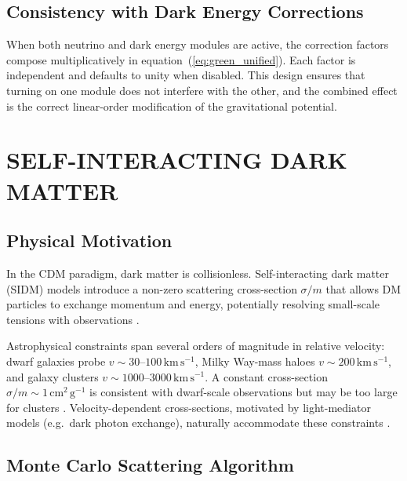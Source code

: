 \documentclass[fleqn,usenatbib]{mnras}
\newcommand{\sigmam}{\sigma/m}
\newcommand{\kms}{\,\mathrm{km\,s^{-1}}}
\begin{document}
\subsection{Consistency with Dark Energy Corrections}
\label{sec:nu_de_compose}

When both neutrino and dark energy modules are active, the correction
factors compose multiplicatively in equation~(\ref{eq:green_unified}).
Each factor is independent and defaults to unity when disabled.  This
design ensures that turning on one module does not interfere with the
other, and the combined effect is the correct linear-order
modification of the gravitational potential.


\section{SELF-INTERACTING DARK MATTER}
\label{sec:sidm}

\subsection{Physical Motivation}
\label{sec:sidm_motivation}

In the CDM paradigm, dark matter is collisionless.
Self-interacting dark matter (SIDM) models introduce a non-zero
scattering cross-section $\sigmam$ that allows DM particles to
exchange momentum and energy, potentially resolving small-scale
tensions with observations \citep{Spergel2000,Tulin2018}.

Astrophysical constraints span several orders of magnitude in
relative velocity: dwarf galaxies probe $v \sim 30$--$100\kms$,
Milky Way-mass haloes $v \sim 200\kms$, and galaxy clusters
$v \sim 1000$--$3000\kms$.  A constant cross-section
$\sigmam \sim 1\,\mathrm{cm^2\,g^{-1}}$ is consistent with
dwarf-scale observations but may be too large for clusters
\citep{Kaplinghat2016}.  Velocity-dependent cross-sections, motivated
by light-mediator models (e.g.\ dark photon exchange), naturally
accommodate these constraints
\citep{Feng2009,Tulin2013,Kaplinghat2016}.

\subsection{Monte Carlo Scattering Algorithm}
\label{sec:sidm_algorithm}
\end{document}
